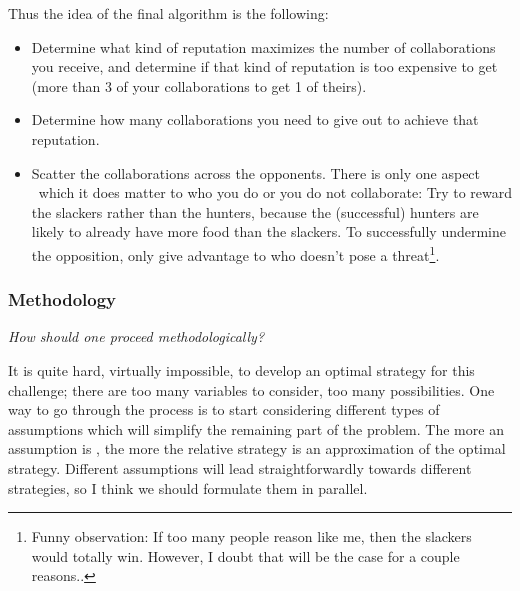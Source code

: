 \documentclass[10pt,fleqn]{article}
\begin{document}
Thus the idea of the final algorithm is the following:
\begin{itemize}
  \item Determine what kind of reputation maximizes the number of collaborations
  you receive, and determine if that kind of reputation is too expensive to get
  (more than 3 of your collaborations to get 1 of theirs).
  \item Determine how many collaborations you need to give out to achieve that
  reputation.
  \item Scatter the collaborations across the opponents. There is only one
  aspect \wrt\ which it does matter to who you do or you do not collaborate: Try
  to reward the slackers rather than the hunters, because the (successful)
  hunters are likely to already have more food than the slackers. To
  successfully undermine the opposition, only give advantage to who doesn't pose
  a threat\footnote{Funny observation: If too many people reason like me,
  then the slackers would totally win. However, I doubt that will be the
  case for a couple reasons..}.
\end{itemize}


\subsubsection{Methodology}
\emph{How should one proceed methodologically?}

It is quite hard, virtually impossible, to develop an optimal strategy for this
challenge; there are too many variables to consider, too many possibilities. One
way to go through the process is to start considering different types of
assumptions which will simplify the remaining part of the problem. The more an
assumption is , the more the relative strategy is an approximation
of the optimal strategy. Different assumptions will lead straightforwardly
towards different strategies, so I think we should formulate them in parallel.
\end{document}
